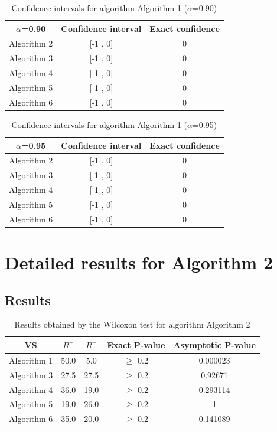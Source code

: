 \documentclass[a4paper,10pt]{article}
\begin{document}
\begin{table}[!htp]
\centering\small
\begin{tabular}{
|c|c|c|}
\hline
 $\alpha$=0.90 & Confidence interval & Exact confidence \\ \hline 
Algorithm 2 & [-1 , 0] & 0\\ \hline 
Algorithm 3 & [-1 , 0] & 0\\ \hline 
Algorithm 4 & [-1 , 0] & 0\\ \hline 
Algorithm 5 & [-1 , 0] & 0\\ \hline 
Algorithm 6 & [-1 , 0] & 0\\ \hline 

\end{tabular}
\caption{Confidence intervals for algorithm Algorithm 1 ($\alpha$=0.90)}
\end{table}
\begin{table}[!htp]
\centering\small
\begin{tabular}{
|c|c|c|}
\hline
 $\alpha$=0.95 & Confidence interval & Exact confidence \\ \hline 
Algorithm 2 & [-1 , 0] & 0\\ \hline 
Algorithm 3 & [-1 , 0] & 0\\ \hline 
Algorithm 4 & [-1 , 0] & 0\\ \hline 
Algorithm 5 & [-1 , 0] & 0\\ \hline 
Algorithm 6 & [-1 , 0] & 0\\ \hline 

\end{tabular}
\caption{Confidence intervals for algorithm Algorithm 1 ($\alpha$=0.95)}
\end{table}

 \clearpage 


\section{Detailed results for Algorithm 2}


\subsection{Results}

\begin{table}[!htp]
\centering\small
\begin{tabular}{
|c|c|c|c|c|}
\hline
 VS & $R^{+}$ & $R^{-}$ & Exact P-value & Asymptotic P-value \\ \hline 
Algorithm 1 & 50.0 & 5.0 & $\geq$ 0.2 & 0.000023\\ \hline 
Algorithm 3 & 27.5 & 27.5 & $\geq$ 0.2 & 0.92671\\ \hline 
Algorithm 4 & 36.0 & 19.0 & $\geq$ 0.2 & 0.293114\\ \hline 
Algorithm 5 & 19.0 & 26.0 & $\geq$ 0.2 & 1\\ \hline 
Algorithm 6 & 35.0 & 20.0 & $\geq$ 0.2 & 0.141089\\ \hline 

\end{tabular}
\caption{Results obtained by the Wilcoxon test for algorithm Algorithm 2}
\end{table}
\end{document}

